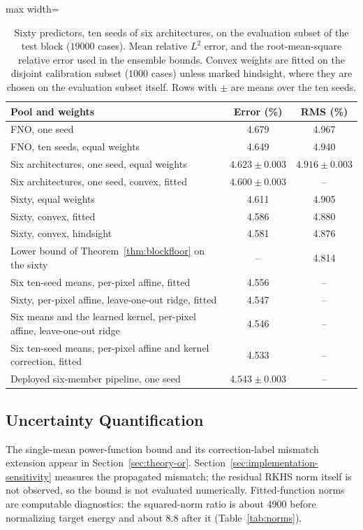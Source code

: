 \documentclass[twoside,11pt]{article}
\newcommand{\saFnoOne}{4.679}        %
\newcommand{\saFnoOneRms}{4.967}
\newcommand{\saFnoTen}{4.649}        %
\newcommand{\saFnoTenRms}{4.940}
\newcommand{\saSixEq}{4.623}         %
\newcommand{\saSixEqSd}{0.003}
\newcommand{\saSixEqRms}{4.916}
\newcommand{\saSixEqRmsSd}{0.003}
\newcommand{\saSixConvex}{4.600}     %
\newcommand{\saSixConvexSd}{0.003}
\newcommand{\saSixtyEq}{4.611}
\newcommand{\saSixtyEqRms}{4.905}
\newcommand{\saSixtyConvex}{4.586}   %
\newcommand{\saSixtyConvexRms}{4.880}
\newcommand{\saSixtyOracle}{4.581}   %
\newcommand{\saSixtyOracleRms}{4.876}
\newcommand{\saBound}{4.814}         %
\newcommand{\saPerpixMeans}{4.556}   %
\newcommand{\saDeployedEv}{4.543}    %
\newcommand{\saDeployedEvSd}{0.003}
\newcommand{\saPoolPipeline}{4.533}   %
\newcommand{\saPerpixSixtyLoo}{4.547}   %
\newcommand{\saSevenMeansLoo}{4.546}    %
\begin{document}
\begin{table}[t]
\centering

\begin{adjustbox}{max width=\linewidth}
\begin{tabular}{lcc}
\toprule
Pool and weights & Error (\%) & RMS (\%) \\
\midrule
FNO, one seed & \saFnoOne & \saFnoOneRms \\
FNO, ten seeds, equal weights & \saFnoTen & \saFnoTenRms \\
Six architectures, one seed, equal weights & $\saSixEq\pm\saSixEqSd$ & $\saSixEqRms\pm\saSixEqRmsSd$ \\
Six architectures, one seed, convex, fitted & $\saSixConvex\pm\saSixConvexSd$ & -- \\
Sixty, equal weights & \saSixtyEq & \saSixtyEqRms \\
Sixty, convex, fitted & \saSixtyConvex & \saSixtyConvexRms \\
Sixty, convex, hindsight & \saSixtyOracle & \saSixtyOracleRms \\
Lower bound of Theorem~\ref{thm:blockfloor} on the sixty & -- & \saBound \\
Six ten-seed means, per-pixel affine, fitted & \saPerpixMeans & -- \\
Sixty, per-pixel affine, leave-one-out ridge, fitted & \saPerpixSixtyLoo & -- \\
Six means and the learned kernel, per-pixel affine, leave-one-out ridge & \saSevenMeansLoo & -- \\
Six ten-seed means, per-pixel affine and kernel correction, fitted & \saPoolPipeline & -- \\
Deployed six-member pipeline, one seed & $\saDeployedEv\pm\saDeployedEvSd$ & -- \\
\bottomrule
\end{tabular}
\end{adjustbox}
\caption{Sixty predictors, ten seeds of six architectures, on the evaluation
subset of the test block ($19000$ cases). Mean relative $L^2$ error, and the
root-mean-square relative error used in the ensemble bounds. Convex weights are
fitted on the disjoint calibration subset ($1000$ cases) unless marked
hindsight, where they are chosen on the evaluation subset itself. Rows with
$\pm$ are means over the ten seeds.}
\label{tab:seedarch}
\end{table}
\subsection{Uncertainty Quantification}
\label{sec:uq}
The single-mean power-function bound and its correction-label mismatch extension appear in Section~\ref{sec:theory-or}. Section~\ref{sec:implementation-sensitivity} measures the propagated mismatch; the residual RKHS norm itself is not observed, so the bound is not evaluated numerically. Fitted-function norms are computable diagnostics: the squared-norm ratio is about 4900 before normalizing target energy and about 8.8 after it (Table~\ref{tab:norms}).
\end{document}
